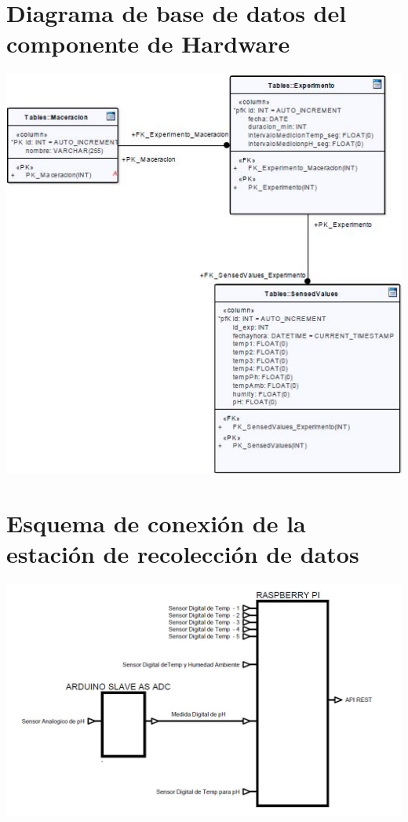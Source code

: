     \begin{minipage}{0.95\textwidth}
    \chapter{Diagrama de base de datos del componente de Hardware}
        \centering
        \includegraphics[scale=1]{diagramaBD-Rasp.jpg}
        \label{fig:DiagramaBdRasp}
    
    \end{minipage}
    
    \begin{minipage}{0.95\textwidth}
    \chapter{Esquema de conexión de la estación de recolección de datos}
        \centering
        \includegraphics[scale=0.55]{EsquemaHardware.jpg}
        \label{fig:EsquemaHardware}
    \end{minipage}
    
